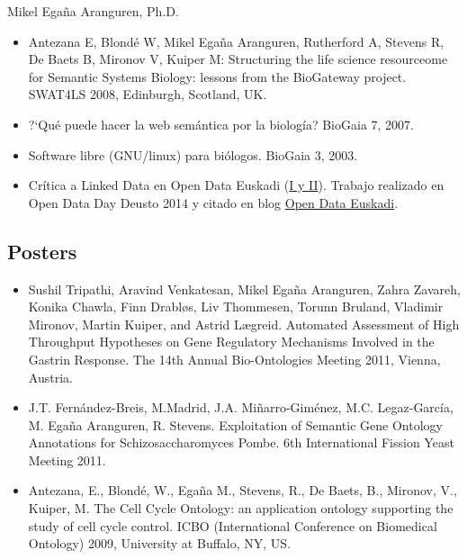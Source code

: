 \documentclass[english,11pt,a4paper,oneside]{article}
\begin{document}
\begin{cv}{Mikel Ega\~na Aranguren, Ph.D. }
\begin{itemize}
	\item Antezana E, Blond\'e W, Mikel Ega\~na Aranguren, Rutherford A, Stevens R, De Baets B, Mironov V, Kuiper M: Structuring the life science resourceome for Semantic Systems Biology: lessons from the BioGateway project. SWAT4LS 2008, Edinburgh, Scotland, UK.
	
	\item ?`Qu\'e puede hacer la web sem\'antica por la biolog\'ia? BioGaia 7, 2007.
	
	\item Software libre (GNU/linux) para bi\'ologos. BioGaia 3, 2003.
	
	\item Cr\'itica a Linked Data en Open Data Euskadi (\href{http://mikeleganaaranguren.wordpress.com/2014/02/26/critica-a-linked-data-en-open-data-euskadi-ii-solucion/}{I y II}). Trabajo realizado en Open Data Day Deusto 2014 y citado en blog \href{http://opendata.blog.euskadi.net/blog-es/tecnico/779/}{Open Data Euskadi}. 
\end{itemize}
		

\subsection*{Posters}

\begin{itemize}

\item Sushil Tripathi, Aravind Venkatesan, Mikel Ega\~na Aranguren, Zahra Zavareh, Konika Chawla, Finn Drabl\o s, Liv Thommesen, Torunn Bruland, Vladimir Mironov, Martin Kuiper, and Astrid L\ae greid. Automated Assessment of High Throughput Hypotheses on Gene Regulatory Mechanisms Involved in the Gastrin Response. The 14th Annual Bio-Ontologies Meeting 2011, Vienna, Austria.

\item J.T. Fern\'andez-Breis, M.Madrid, J.A. Mi\~narro-Gim\'enez, M.C. Legaz-Garc\'ia, M. Ega\~na Aranguren, R. Stevens. Exploitation of Semantic Gene Ontology Annotations for Schizosaccharomyces Pombe. 6th International Fission Yeast Meeting 2011.

\item Antezana, E., Blond\'e, W., Ega\~na M., Stevens, R., De Baets, B., Mironov, V., Kuiper, M. The Cell Cycle Ontology: an application ontology supporting the study of cell cycle control. ICBO (International Conference on Biomedical Ontology) 2009, University at Buffalo, NY, US.


\end{itemize}
\end{cv}
\end{document}
